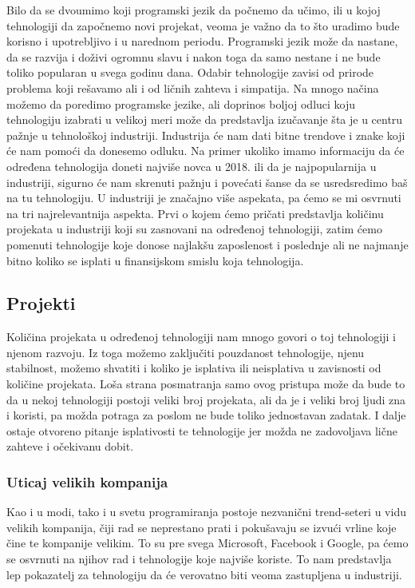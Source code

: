 \documentclass[a4paper]{article}
\begin{document}
Bilo da se dvoumimo koji programski jezik da počnemo da učimo, ili u kojoj tehnologiji da započnemo novi projekat, veoma je važno da to što uradimo bude korisno i upotrebljivo i u narednom periodu. Programski jezik može da nastane, da se razvija i doživi ogromnu slavu i nakon toga da samo nestane i ne bude toliko popularan u svega godinu dana. Odabir tehnologije zavisi od prirode problema koji rešavamo ali i od ličnih zahteva i simpatija. Na mnogo načina možemo da poredimo programske jezike, ali doprinos boljoj odluci koju tehnologiju izabrati u velikoj meri može da predstavlja izučavanje šta je u centru pažnje u tehnološkoj industriji. Industrija će nam dati bitne trendove i znake koji će nam pomoći da donesemo odluku. Na primer ukoliko imamo informaciju da će određena tehnologija doneti najviše novca u 2018. ili da je najpopularnija u industriji, sigurno će nam skrenuti pažnju i povećati šanse da se usredsredimo baš na tu tehnologiju. U industriji je značajno više aspekata, pa ćemo se mi osvrnuti na tri najrelevantnija aspekta. Prvi o kojem ćemo pričati predstavlja količinu projekata u industriji koji su zasnovani na određenoj tehnologiji, zatim ćemo pomenuti tehnologije koje donose najlakšu zaposlenost i poslednje ali ne najmanje bitno koliko se isplati u finansijskom smislu koja tehnologija.

\subsection{Projekti}
\label{subsec:projekti}
Količina projekata u određenoj tehnologiji nam mnogo govori o toj tehnologiji i njenom razvoju. Iz toga možemo zaključiti pouzdanost tehnologije, njenu stabilnost, možemo shvatiti i koliko je isplativa ili neisplativa u zavisnosti od količine projekata. Loša strana posmatranja samo ovog pristupa može da bude to da u nekoj tehnologiji postoji veliki broj projekata, ali da je i veliki broj ljudi zna i koristi, pa možda potraga za poslom ne bude toliko jednostavan zadatak. I dalje ostaje otvoreno pitanje isplativosti te tehnologije jer možda ne zadovoljava lične zahteve i očekivanu dobit.

\subsubsection{Uticaj velikih kompanija}
\label{subsec:uticaj velikih kompanija}

Kao i u modi, tako i u svetu programiranja postoje nezvanični trend-seteri  u vidu velikih kompanija, čiji rad se neprestano prati i pokušavaju se izvući vrline koje čine te kompanije velikim. To su pre svega Microsoft, Facebook i Google, pa ćemo se osvrnuti na njihov rad i tehnologije koje najviše koriste. To nam predstavlja lep pokazatelj za tehnologiju da će verovatno biti veoma zastupljena u industriji.
\end{document}
